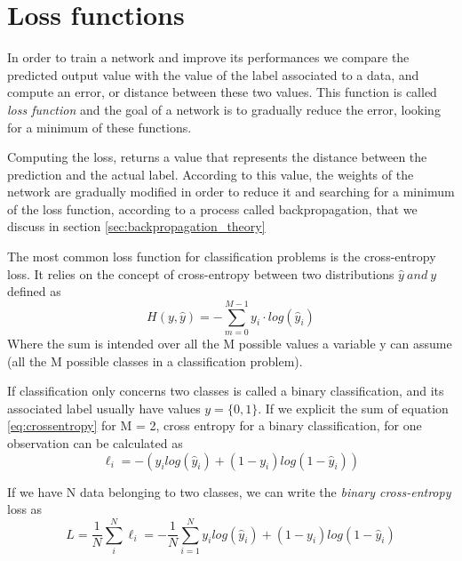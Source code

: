 \documentclass[11pt]{report}
\begin{document}
\section{Loss functions}\label{sec:loss_functions}

In order to train a network and improve its performances we compare the predicted output value with the value of the label associated to a data, and compute an error, or distance between these two values.
This function is called \emph{loss function} and the goal of a network is to gradually reduce the error, looking for a minimum of these functions.

Computing the loss, returns a value that represents the distance between the prediction and the actual label.
According to this value, the weights of the network are gradually modified in order to reduce it and searching for a minimum of the loss function, according to a process called backpropagation, that we discuss in section \ref{sec:backpropagation_theory}


The most common loss function for classification problems is the cross-entropy loss.
It relies on the concept of cross-entropy between two distributions $\hat y \ and \ y$ defined as
\begin{equation}\label{eq:crossentropy}
H(y, \hat y) = -\sum_{m= 0}^{M-1} y_i \cdot log(\hat y_i)
\end{equation}
Where the sum is intended over all the M possible values a variable y can assume (all the M possible classes in a classification problem).

If classification only concerns two classes is called a binary classification, and its associated label usually have values $y = \{0, 1\}$.
If we explicit the sum of equation \ref{eq:crossentropy} for M = 2, cross entropy for a binary classification, for one observation can be calculated as
\begin{equation}
\ell_i = -(y_i log(\hat y_i) + (1-y_i)log(1-\hat y_i))
\end{equation}

If we have N data belonging to two classes, we can write the \emph{binary cross-entropy} loss as
\begin{equation}\label{eq:binary_crossentropy}
L = \frac{1}{N} \sum_i ^N \ell_i = -\frac{1}{N} \sum_{i= 1}^N y_i log(\hat y_i) + (1-y_i)log(1-\hat y_i)
\end{equation}
\end{document}
